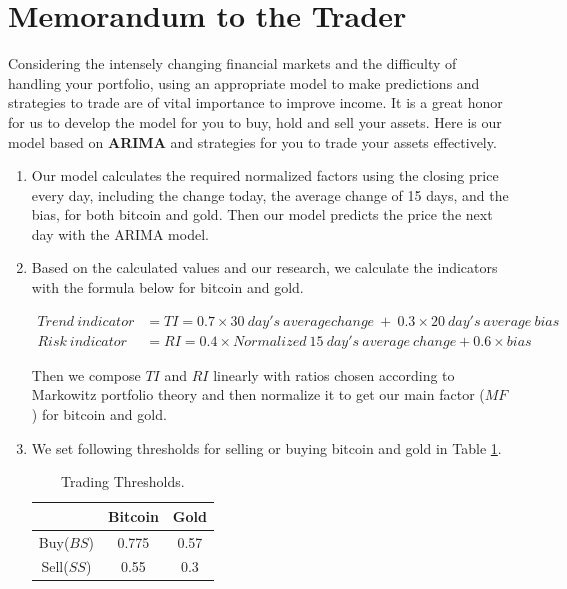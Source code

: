 \documentclass[12pt,a4paper]{article}
\newcommand{\Predictor}{ARIMA }
\begin{document}
\begin{spacing}{1.2}
\begin{thebibliography}{00}
\end{thebibliography}



\newpage
\addtocounter{page}{-1}
\thispagestyle{empty}

{\centering\section*{Memorandum to the Trader}}

Considering the intensely changing financial markets and the difficulty of handling your portfolio, using an appropriate model to make predictions and strategies to trade are of vital importance to improve income. It is a great honor for us to develop the model for you to buy, hold and sell your assets. Here is our model based on \textbf{\Predictor} and strategies for you to trade your assets effectively.  
	
\begin{enumerate}
	\item Our model calculates the required normalized factors using the closing price every day, including the change today, the average change of 15 days, and the bias, for both bitcoin and gold. Then our model predicts the price the next day with the ARIMA model.
	 
	\item Based on the calculated values and our research, we calculate the indicators with the formula below for bitcoin and gold. 
	

\begin{align*}
	Trend \ indicator &= TI = 0.7 \times 30 \ day's \ average change \ + \ 0.3 \times 20 \ day's \ average \ bias \\
	Risk \ indicator &= RI = 0.4 \times Normalized \ 15 \ day's \ average \ change + 0.6 \times bias
\end{align*}
	
	Then we compose $TI$ and $RI$ linearly with ratios chosen according to Markowitz portfolio theory and then normalize it to get our main factor ($MF$) for bitcoin and gold. 
	
	\item We set following thresholds for selling or buying bitcoin and gold in Table \ref{table:memo_threshold}.
	
	\begin{table}[H]
		\renewcommand{\arraystretch}{1.5}
		\caption{Trading Thresholds.}
		\label{table:memo_threshold}
		\begin{center}
			{\footnotesize
				\begin{tabular}{c c c}
					\toprule
					{ } & {Bitcoin} & {Gold} \\
					\midrule
					Buy($BS$) & 0.775 & 0.57 \\
					Sell($SS$) & 0.55 & 0.3 \\
					\bottomrule
			\end{tabular}}
		\end{center}	
	\end{table}


\end{enumerate}
\end{spacing}
\end{document}
